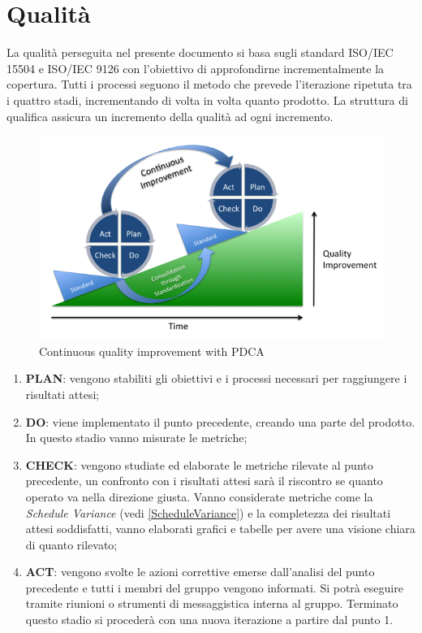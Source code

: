 \pagebreak
\section{Qualità}
La qualità perseguita nel presente documento si basa sugli standard ISO/IEC 15504  e ISO/IEC 9126 con l'obiettivo di approfondirne incrementalmente la copertura. Tutti i processi seguono il metodo  che prevede l'iterazione ripetuta tra i quattro stadi, incrementando di volta in volta quanto prodotto. La struttura di qualifica assicura un incremento della qualità ad ogni incremento. \\
	\begin{figure}[h]
	\centering \includegraphics[width=1\textwidth]{PDCA.png}
	\caption{Continuous quality improvement with PDCA}
	\end{figure}
	
	\begin{enumerate}
		\item \textbf{PLAN}: vengono stabiliti gli obiettivi e i processi necessari per raggiungere i risultati attesi;
		\item \textbf{DO}: viene implementato il punto precedente, creando una parte del prodotto. In questo stadio vanno misurate le metriche;
		\item \textbf{CHECK}: vengono studiate ed elaborate le metriche rilevate al punto precedente, un confronto con i risultati attesi sarà il riscontro se quanto operato va nella direzione giusta. Vanno considerate metriche come la \emph{Schedule Variance} (vedi \ref{ScheduleVariance}) e la completezza dei risultati attesi soddisfatti, vanno elaborati grafici e tabelle per avere una visione chiara di quanto rilevato;
		\item \textbf{ACT}: vengono svolte le azioni correttive emerse dall'analisi del punto precedente e tutti i membri del gruppo vengono informati. Si potrà eseguire tramite riunioni o strumenti di messaggistica interna al gruppo. Terminato questo stadio si procederà con una nuova iterazione a partire dal punto 1.
	\end{enumerate}

